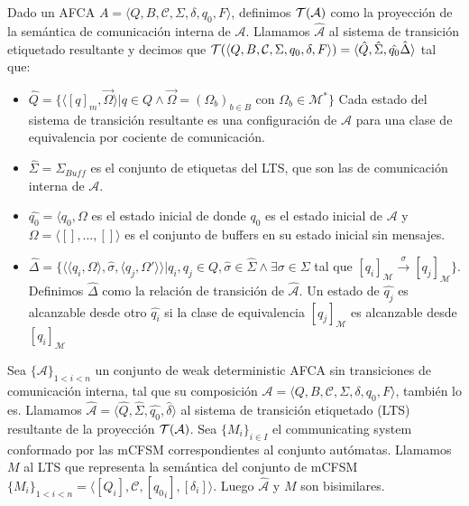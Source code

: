 \begin{definition}\label{def:pci}
Dado un AFCA $A = \langle Q, B, \mathcal{C}, \Sigma, \delta, q_0, F \rangle$, definimos $\mathcal{T}(\mathcal{A})$ como la proyección de la semántica de comunicación interna de $\mathcal{A}$. Llamamos $\hat{\mathcal{A}}$ al sistema de transición etiquetado resultante y decimos que $\mathcal{T} (\langle Q, B, \mathcal{C}, \Sigma, q_0, \delta, F \rangle)= \langle \hat{Q}, \hat{\Sigma}, \hat{q_0} \hat{\Delta} \rangle$ tal que:
\begin{itemize}
    \item $ \hat{Q} = \{ \langle [q]_m, \overrightarrow{\Omega} \rangle | q \in Q \land \overrightarrow{\Omega} = (\Omega_b)_{b \in B}$ con $\Omega_b \in \mathcal{M}^* \}$ Cada estado del sistema de transición resultante es una configuración de $\mathcal{A}$ para una clase de equivalencia por cociente de comunicación.
    
    \item $\hat{\Sigma} = \Sigma_{Buff} $ es el conjunto de etiquetas del LTS, que son las de comunicación interna de $\mathcal{A}$.
    
    \item $\hat{q_0}= \langle q_0, \Omega$ es el estado inicial de  donde $q_0$ es el estado inicial de $\mathcal{A}$ y $\Omega = \langle [], \ldots, [] \rangle$ es el conjunto de buffers en su estado inicial sin mensajes.
    
    \item $\hat{\Delta}= \{\langle \langle q_i, \Omega \rangle, \hat{\sigma},\langle q_j, \Omega' \rangle \rangle | q_i,q_j \in Q, \hat{\sigma} \in \hat{\Sigma} \land \exists \sigma \in \Sigma$ tal que  $[q_i]_\mathcal{M} \xrightarrow{\sigma} [q_j]_\mathcal{M} \}$. Definimos $\hat{\Delta}$ como la relación de transición de $\hat{\mathcal{A}}$. Un estado de $\hat{q_j}$ es alcanzable desde otro $\hat{q_i}$ si la clase de equivalencia $[q_j]_\mathcal{M}$ es alcanzable desde $[q_i]_\mathcal{M}$
    
\end{itemize}
\end{definition}

\begin{theorem} Sea $\{\mathcal{A}\}_{1 < i < n}$ un conjunto de weak deterministic AFCA sin transiciones de comunicación interna, tal que su composición $\mathcal{A} = \langle Q, B, \mathcal{C},\Sigma, \delta, q_0, F \rangle$, también lo es. Llamamos $\hat{\mathcal{A}}=\langle \hat{Q}, \hat{\Sigma}, \hat{q_0}, \hat{\delta} \rangle$ al sistema de transición etiquetado (LTS) resultante de la proyección $\mathcal{T}(\mathcal{A})$. Sea $\{M_i\}_{i \in I}$ el communicating system conformado por las mCFSM correspondientes al conjunto autómatas. Llamamos $M$ al LTS que representa la semántica del conjunto de mCFSM $\{M_i\}_{1< i < n}= \langle [Q_i], \mathcal{C}, [{q_0}_i], [\delta_i] \rangle$. Luego $\hat{\mathcal{A}}$ y $M$ son bisimilares. 
\end{theorem}

